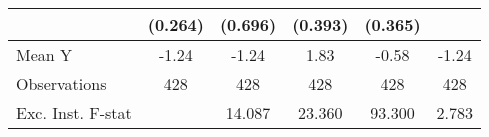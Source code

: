 {\begin{tabular}{l*{5}{c}}
            &     (0.264)         &     (0.696)         &     (0.393)         &     (0.365)         &                     \\
\midrule
Mean Y      &       -1.24         &       -1.24         &        1.83         &       -0.58         &       -1.24         \\
Observations&         428         &         428         &         428         &         428         &         428         \\
Exc. Inst. F-stat&                     &      14.087         &      23.360         &      93.300         &       2.783         \\
\bottomrule
\end{tabular}
}
